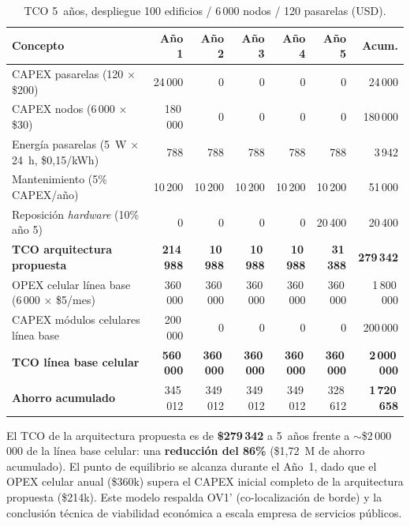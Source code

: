 \begin{table}[h]
\centering
\caption{TCO 5~años, despliegue 100 edificios / 6\,000 nodos / 120 pasarelas (USD).}
\label{tab:sostenibilidad-tco}
\begin{tabular}{|p{3.8cm}|r|r|r|r|r|r|}
\hline
\textbf{Concepto} & \textbf{Año 1} & \textbf{Año 2} & \textbf{Año 3} & \textbf{Año 4} & \textbf{Año 5} & \textbf{Acum.} \\
\hline
CAPEX pasarelas (120 $\times$ \$200) & 24\,000 & 0 & 0 & 0 & 0 & 24\,000 \\
\hline
CAPEX nodos (6\,000 $\times$ \$30) & 180\,000 & 0 & 0 & 0 & 0 & 180\,000 \\
\hline
Energía pasarelas (5~W $\times$ 24~h, \$0,15/kWh) & 788 & 788 & 788 & 788 & 788 & 3\,942 \\
\hline
Mantenimiento (5\% CAPEX/año) & 10\,200 & 10\,200 & 10\,200 & 10\,200 & 10\,200 & 51\,000 \\
\hline
Reposición \emph{hardware} (10\% año 5) & 0 & 0 & 0 & 0 & 20\,400 & 20\,400 \\
\hline
\textbf{TCO arquitectura propuesta} & \textbf{214\,988} & \textbf{10\,988} & \textbf{10\,988} & \textbf{10\,988} & \textbf{31\,388} & \textbf{279\,342} \\
\hline
\hline
OPEX celular línea base (6\,000 $\times$ \$5/mes) & 360\,000 & 360\,000 & 360\,000 & 360\,000 & 360\,000 & 1\,800\,000 \\
\hline
CAPEX módulos celulares línea base & 200\,000 & 0 & 0 & 0 & 0 & 200\,000 \\
\hline
\textbf{TCO línea base celular} & \textbf{560\,000} & \textbf{360\,000} & \textbf{360\,000} & \textbf{360\,000} & \textbf{360\,000} & \textbf{2\,000\,000} \\
\hline
\hline
\textbf{Ahorro acumulado} & 345\,012 & 349\,012 & 349\,012 & 349\,012 & 328\,612 & \textbf{1\,720\,658} \\
\hline
\end{tabular}
\end{table}

El TCO de la arquitectura propuesta es de \textbf{\$279\,342} a 5~años frente a $\sim$\$2\,000\,000 de la línea base celular: una \textbf{reducción del 86\%} (\$1{,}72~M de ahorro acumulado). El punto de equilibrio se alcanza durante el Año~1, dado que el OPEX celular anual (\$360k) supera el CAPEX inicial completo de la arquitectura propuesta (\$214k). Este modelo respalda OV1' (co-localización de borde) y la conclusión técnica de viabilidad económica a escala empresa de servicios públicos.

